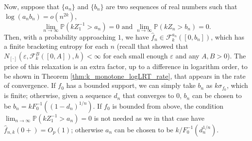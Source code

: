 \documentclass[12pt,letterpaper, twoside, openany]{article}
\theoremstyle{plain}
\begin{document}
Now, suppose that $\{a_n\}$ and $\{b_n\}$ are two sequences of real numbers such that $\log (a_n b_n) = o(n^{2k})$,
	\begin{equation}\label{eq:a_nb_n}
		\lim_{n \rightarrow \infty} \mathbb{P}(k Z_1^{-1} > a_n) = 0 \text{ and }		\lim_{n \rightarrow \infty} \mathbb{P}(k Z_n > b_n) = 0.
	\end{equation}
	Then, with a probability approaching $1$, we have $\hat{f}_n \in \mathcal{F}^{a_n}_k([0, b_n])$, which has a finite bracketing entropy for each $n$ (recall that \cite{gao2009rate} showed that $N_{[\cdot]}(\varepsilon, \mathcal{F}^B_k([0, A]), h) < \infty$ for each small enough $\varepsilon$ and any $A, B > 0$). The price of this relaxation is an extra factor, up to a difference in logarithm order, to be shown in Theorem \ref{thm:k_monotone_logLRT_rate}, that appears in the rate of convergence. If $f_0$ has a bounded support, we can simply take $b_n$ as $k \sigma_{f_0}$, which is finite; otherwise, given a sequence $d_n$ that converges to $0$, $b_n$ can be chosen to be $b_n = k F^{-1}_0((1-d_n)^{1/n})$. If $f_0$ is bounded from above, the condition $\lim_{n\rightarrow \infty}\mathbb{P}(k Z^{-1}_1 > a_n) = 0$ is not needed as we in that case have $\hat{f}_{n,k}(0+) = O_p(1)$; otherwise $a_n$ can be chosen to be $k/F_0^{-1}(d^{1/n}_n)$.
	
\end{document}
